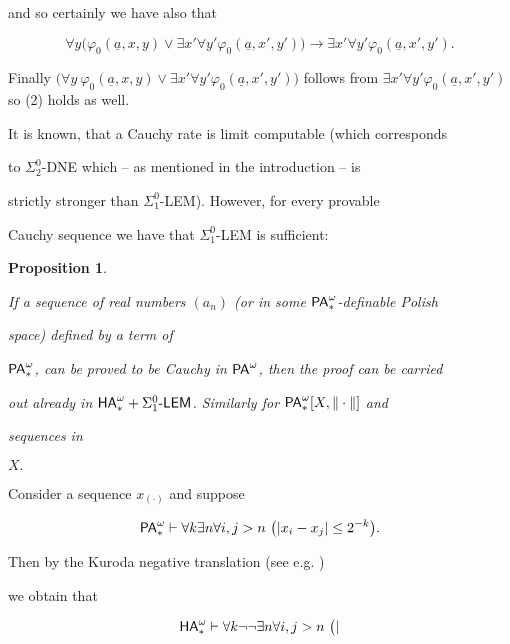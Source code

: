 \documentclass[1p]{elsarticle}
\newcommand{\usftext}[1]{\textsf{\upshape #1}}
\newcommand{\ha}{\ensuremath{{\usftext{HA}}^\omega}} %
\newcommand{\pa}{\ensuremath{{\usftext{PA}}^\omega}} %
\newcommand{\LEM}{\ensuremath{\Sigma^0_1\usftext{-LEM}}}
\newcommand{\tup}{\underline} %
\theoremstyle{plain}
\newtheorem{prop}[thm]{Proposition}
\theoremstyle{definition}
\theoremstyle{remark}
\renewenvironment{proof}[1][]{\noindent{\bf Proof{#1}. }}{\nopagebreak[4]{\hspace*{\fill}


  $\Box$              %

 }{\vspace{2ex}}}
\renewcommand{\phi}{\varphi}
\theoremstyle{definition}
\begin{document}
{\begin{proof}
\begin{enumerate}
\[\]

and so certainly we have also that

\[

\forall y\big(\phi_0(\tup a,x,y) \vee \exists x'\forall y' \phi_0(\tup a,x',y') \big) \rightarrow \exists x'\forall y' \phi_0(\tup a,x',y').

\]

Finally $\big(\forall y\ \phi_0(\tup a,x,y) \vee \exists x'\forall y' \phi_0(\tup a,x',y')\big)$ follows from $\exists x'\forall y' \phi_0(\tup a,x',y')$ so (2) holds as well.

\end{enumerate}

\end{proof}



It is known, that a Cauchy rate is limit computable (which corresponds 

to $\Sigma^0_2$-DNE which -- as mentioned in the introduction -- is 

strictly stronger than $\Sigma^0_1$-LEM). However, for every provable   

Cauchy sequence we have that $\Sigma^0_1$-LEM is sufficient:

\begin{prop}\label{p:limComp}

If a sequence of real numbers $(a_n)$ (or in some $\pa_*$-definable Polish 

space) defined by a term of 

$\pa_*$, can be proved to be Cauchy in $\pa$, then the proof can be carried 

out already in $\ha_*+\LEM$. Similarly for $\pa_*[X,\|\cdot\|]$ and 

sequences in 

$X.$

\end{prop}

\begin{proof}

Consider a sequence $x_{(\cdot)}$ and suppose

\[ \pa_*\vdash \forall k\exists n\forall i,j>n\ 

\big(| x_i - x_j| \leq 2^{-k}\big). \]

Then by the Kuroda negative translation (see e.g. \cite{Kohlenbach(book)}) 

we obtain that

\[ \ha_*\vdash \forall k\neg\neg\exists n\forall i,j>n\ \big(| 

\]
\end{proof}}
\end{document}

